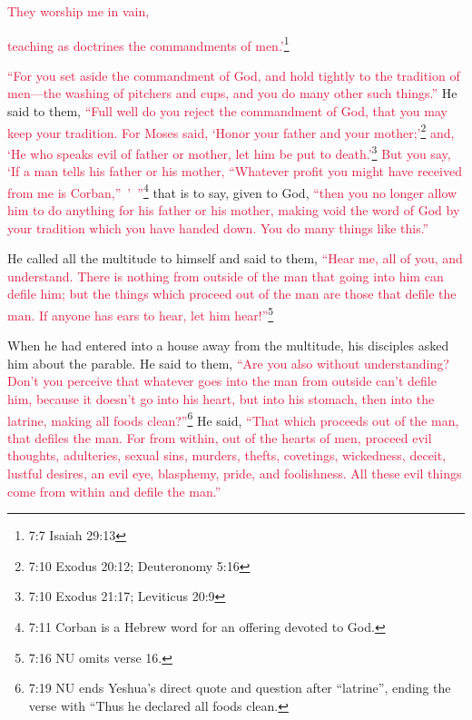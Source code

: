 \myverse{}\textcolor{crimson}{They worship me in vain,}

\textcolor{crimson}{teaching as doctrines the commandments of men.’}\footnote{7:7 Isaiah 29:13
}

\myverse{}\textcolor{crimson}{“For you set aside the commandment of God, and hold tightly
	to the tradition of men—the washing of pitchers and cups, and you do many other such things.”}
\myverse{}He said to them,
\textcolor{crimson}{“Full well do you reject the commandment of God, that you may keep your tradition.
}
\myverse{}\textcolor{crimson}{For Moses said, ‘Honor your father and your mother;’}\footnote{7:10 Exodus 20:12;
	Deuteronomy 5:16}
\textcolor{crimson}{and, ‘He who speaks evil of father or mother, let him be put to death.’}\footnote{7:10 Exodus 21:17;
	Leviticus 20:9}
\myverse{}\textcolor{crimson}{But you say, ‘If a man tells his father or his mother, “Whatever profit
	you might have received from me is Corban,” ’ ”}\footnote{7:11 Corban is a Hebrew word for an offering devoted to God.} that is to say, given to God,
\myverse{}\textcolor{crimson}{“then you no longer allow him to do anything for his father or his mother,
}
\myverse{}\textcolor{crimson}{making void the word of God by your tradition which you have handed down.
	You do many things like this.”}

\myverse{}He called all the multitude to himself and said to them,
\textcolor{crimson}{“Hear me, all of you, and understand.
}
\myverse{}\textcolor{crimson}{There is nothing from outside of the man that going into him can defile
	him; but the things which proceed out of the man are those that defile the man.
}
\myverse{}\textcolor{crimson}{If anyone has ears to hear, let him hear!”}\footnote{7:16 NU omits verse 16.}

\myverse{}When he had entered into a house away from the multitude, his
disciples asked him about the parable.
\myverse{}He said to them,
\textcolor{crimson}{“Are you also without understanding? Don’t you perceive that whatever goes into the man from outside
	can’t defile him,
}
\myverse{}\textcolor{crimson}{because it doesn’t go into his heart, but into his stomach, then into
	the latrine, making all foods clean?”}\footnote{7:19 NU ends Yeshua’s direct quote and question after “latrine”, ending the verse with “Thus he declared
	all foods clean.
}
\myverse{}He said,
\textcolor{crimson}{“That which proceeds out of the man, that defiles the man.
}
\myverse{}\textcolor{crimson}{For from within, out of the hearts of men, proceed evil thoughts, adulteries,
	sexual sins, murders, thefts,
}
\myverse{}\textcolor{crimson}{covetings, wickedness, deceit, lustful desires, an evil eye, blasphemy,
	pride, and foolishness.
}
\myverse{}\textcolor{crimson}{All these evil things come from within and defile the man.”
}

